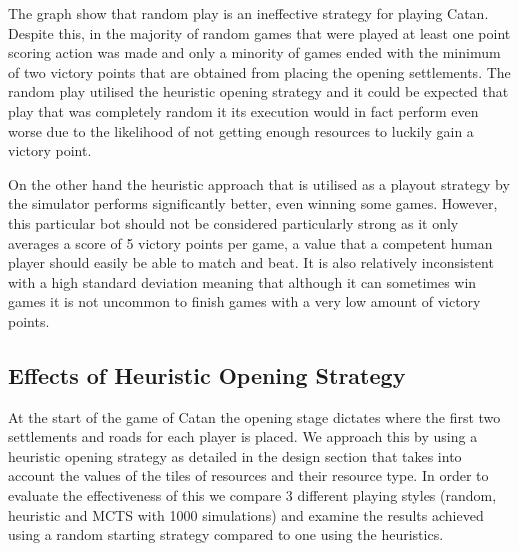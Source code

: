 \documentclass[]{article}
\begin{document}
\par The graph show that random play is an ineffective strategy for playing Catan. Despite this, in the majority of random games that were played at least one point scoring action was made and only a minority of games ended with the minimum of two victory points that are obtained from placing the opening settlements. The random play utilised the heuristic opening strategy and it could be expected that play that was completely random it its execution would in fact perform even worse due to the likelihood of not getting enough resources to luckily gain a victory point.

\par On the other hand the heuristic approach that is utilised as a playout strategy by the simulator performs significantly better, even winning some games. However, this particular bot should not be considered particularly strong as it only averages a score of 5 victory points per game, a value that a competent human player should easily be able to match and beat. It is also relatively inconsistent with a high standard deviation meaning that although it can sometimes win games it is not uncommon to finish games with a very low amount of victory points. 

\subsection{Effects of Heuristic Opening Strategy}

At the start of the game of Catan the opening stage dictates where the first two settlements and roads for each player is placed. We approach this by using a heuristic opening strategy as detailed in the design section that takes into account the values of the tiles of resources and their resource type. In order to evaluate the effectiveness of this we compare 3 different playing styles (random, heuristic and MCTS with 1000 simulations) and examine the results achieved using a random starting strategy compared to one using the heuristics. 
\end{document}
